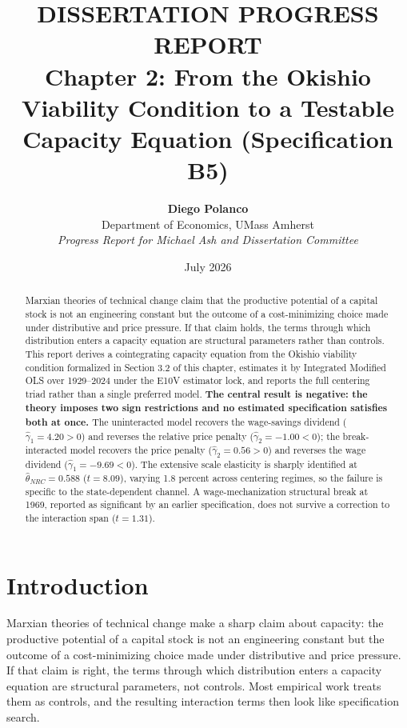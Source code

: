 \documentclass[11pt,a4paper]{article}
\title{\textbf{DISSERTATION PROGRESS REPORT} \\[0.5em] \Large \textbf{Chapter 2: From the Okishio Viability Condition to a Testable Capacity Equation (Specification B5)}}
\author{\textbf{Diego Polanco} \\ Department of Economics, UMass Amherst \\ \textit{Progress Report for Michael Ash and Dissertation Committee}}
\date{July 2026}
\begin{document}
\maketitle

\begin{abstract}
\noindent Marxian theories of technical change claim that the productive potential of a capital stock is not an engineering constant but the outcome of a cost-minimizing choice made under distributive and price pressure. If that claim holds, the terms through which distribution enters a capacity equation are structural parameters rather than controls. This report derives a cointegrating capacity equation from the Okishio viability condition formalized in Section 3.2 of this chapter, estimates it by Integrated Modified OLS over 1929--2024 under the E10V estimator lock, and reports the full centering triad rather than a single preferred model. \textbf{The central result is negative: the theory imposes two sign restrictions and no estimated specification satisfies both at once.} The uninteracted model recovers the wage-savings dividend ($\hat{\gamma}_1 = 4.20 > 0$) and reverses the relative price penalty ($\hat{\gamma}_2 = -1.00 < 0$); the break-interacted model recovers the price penalty ($\hat{\gamma}_2 = 0.56 > 0$) and reverses the wage dividend ($\hat{\gamma}_1 = -9.69 < 0$). The extensive scale elasticity is sharply identified at $\hat{\theta}_{NRC} = 0.588$ ($t = 8.09$), varying 1.8 percent across centering regimes, so the failure is specific to the state-dependent channel. A wage-mechanization structural break at 1969, reported as significant by an earlier specification, does not survive a correction to the interaction span ($t = 1.31$).
\end{abstract}

\section{Introduction}

Marxian theories of technical change make a sharp claim about capacity: the productive potential of a capital stock is not an engineering constant but the outcome of a cost-minimizing choice made under distributive and price pressure. If that claim is right, the terms through which distribution enters a capacity equation are structural parameters, not controls. Most empirical work treats them as controls, and the resulting interaction terms then look like specification search.
\end{document}
